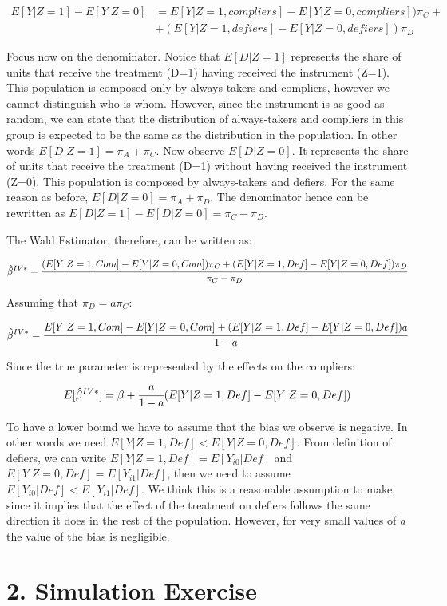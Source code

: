 \documentclass[a4paper,12pt,oneside,English]{article}
\begin{document}
\[
\begin{split}
E[Y|Z=1]-E[Y|Z=0]&=E[Y|Z=1,compliers]-E[Y|Z=0,compliers])\pi_C+\\&+(E[Y|Z=1,defiers]-E[Y|Z=0,defiers])\pi_D
\end{split}
\]

Focus now on the denominator. Notice that $E[D|Z=1]$ represents the share of units that receive the treatment (D=1) having received the instrument (Z=1). This population is composed only by always-takers and compliers, however we cannot distinguish who is whom. However, since the instrument is as good as random, we can state that the distribution of always-takers and compliers in this group is expected to be the same as the distribution in the population. In other words $E[D|Z=1]=\pi_A+\pi_C$. Now observe $E[D|Z=0]$. It represents the share of units that receive the treatment (D=1) without having received the instrument (Z=0). This population is composed by always-takers and defiers. For the same reason as before, $E[D|Z=0]=\pi_A+\pi_D$. The denominator hence can be rewritten as $E[D|Z=1]-E[D|Z=0]=\pi_C-\pi_D$.

The Wald Estimator, therefore, can be written as:

\[
\hat\beta^{IV*}=\cfrac{(E[Y|Z=1,Com]-E[Y|Z=0,Com])\pi_C+(E[Y|Z=1,Def]-E[Y|Z=0,Def])\pi_D}{\pi_C-\pi_D}
\]

Assuming that $\pi_D=a\pi_C$:

\[
\hat\beta^{IV*}=\cfrac{E[Y|Z=1,Com]-E[Y|Z=0,Com]+(E[Y|Z=1,Def]-E[Y|Z=0,Def])a}{1-a}
\]

Since the true parameter is represented by the effects on the compliers:
\[
E[\hat\beta^{IV*}]=\beta+\cfrac{a}{1-a}(E[Y|Z=1,Def]-E[Y|Z=0,Def])
\]

To have a lower bound we have to assume that the bias we observe is negative. In other words we need $E[Y|Z=1,Def]<E[Y|Z=0,Def]$. From definition of defiers, we can write $E[Y|Z=1, Def]=E[Y_{i0}|Def]$ and $E[Y|Z=0, Def]=E[Y_{i1}|Def]$, then we need to assume $E[Y_{i0}|Def]<E[Y_{i1}|Def]$. We think this is a reasonable assumption to make, since it implies that the effect of the treatment on defiers follows the same direction it does in the rest of the population. However, for very small values of \textit{a} the value of the bias is negligible.



\newpage


\section{2. Simulation Exercise}
\end{document}
